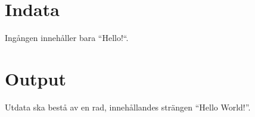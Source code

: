 
\section*{Indata}

Ingången innehåller bara ``Hello!``.

\section*{Output}

Utdata ska bestå av en rad, innehållandes strängen ``Hello World!''.
